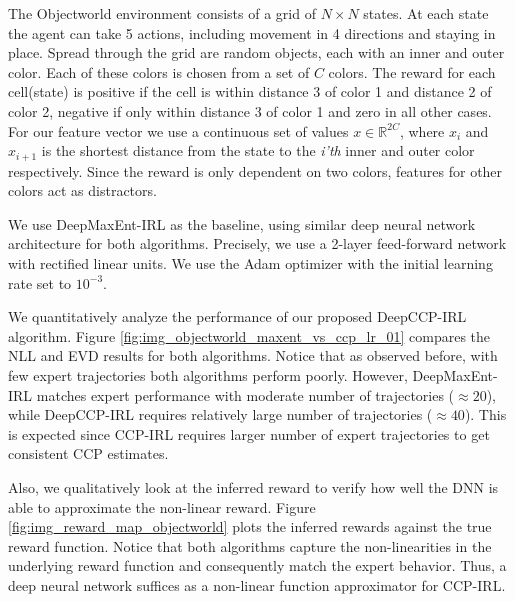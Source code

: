 \documentclass{article}
\begin{document}
The Objectworld environment consists of a grid of $N \times N$ states. At each state the agent can take 5 actions, including movement in 4 directions and staying in place. Spread through the grid are random objects, each with an inner and outer color. Each of these colors is chosen from a set of $C$ colors. The reward for each cell(state) is positive if the cell is within distance 3 of color 1 and distance 2 of color 2, negative if only within distance 3 of color 1 and zero in all other cases. For our feature vector we use a continuous set of values $x \in \mathbb{R}^{2C}$, where $x_i$ and $x_{i+1}$ is the shortest distance from the state to the \emph{i'th} inner and outer color respectively. Since the reward is only dependent on two colors, features for other colors act as distractors. 

We use DeepMaxEnt-IRL \cite{wulfmeier2015maximum} as the baseline, using similar deep neural network architecture for both algorithms. Precisely, we use a 2-layer feed-forward network with rectified linear units. We use the Adam \cite{kingma2014adam} optimizer with the initial learning rate set to $10^{-3}$.

We quantitatively analyze the performance of our proposed DeepCCP-IRL algorithm. 
Figure \ref{fig:img_objectworld_maxent_vs_ccp_lr_01} compares the NLL and EVD results for both algorithms. Notice that as observed before, with few expert trajectories both algorithms perform poorly. However, DeepMaxEnt-IRL matches expert performance with moderate number of trajectories ($\approx 20$), while DeepCCP-IRL requires relatively large number of trajectories ($\approx 40$).
This is expected since CCP-IRL requires larger number of expert trajectories to get consistent CCP estimates.

Also, we qualitatively look at the inferred reward to verify how well the DNN is able to approximate the non-linear reward. Figure \ref{fig:img_reward_map_objectworld} plots the inferred rewards against the true reward function. Notice that both algorithms capture the non-linearities in the underlying reward function and consequently match the expert behavior. Thus, a deep neural network suffices as a non-linear function approximator for CCP-IRL. 
\end{document}
